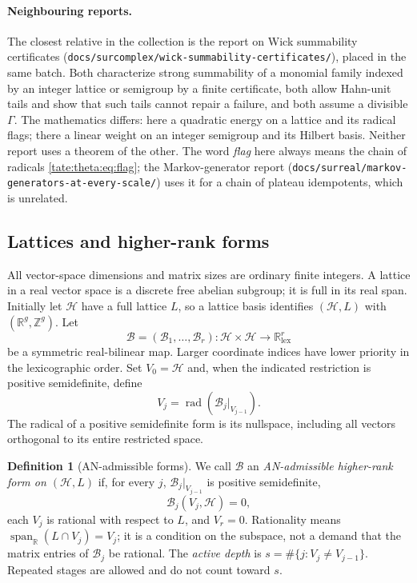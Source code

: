\documentclass[11pt,letterpaper]{article}
\theoremstyle{definition}
\newtheorem{definition}[definition]{Definition}
\newcommand{\R}{\mathbb R}
\newcommand{\Z}{\mathbb Z}
\newcommand{\file}[1]{\nolinkurl{#1}}
\newcommand{\rad}{\operatorname{rad}}
\newcommand{\spanR}{\operatorname{span}_{\R}}
\newcommand{\lex}{\mathrm{lex}}
\newcommand{\cB}{\mathcal B}
\newcommand{\cH}{\mathcal H}
\begin{document}
\paragraph{Neighbouring reports.}
The closest relative in the collection is the report on Wick summability
certificates (\file{docs/surcomplex/wick-summability-certificates/}), placed
in the same batch. Both characterize strong summability of a monomial
family indexed by an integer lattice or semigroup by a finite certificate,
both allow Hahn-unit tails and show that such tails cannot repair a failure,
and both assume a divisible $\Gamma$. The mathematics differs: here a
quadratic energy on a lattice and its radical flags; there a linear weight
on an integer semigroup and its Hilbert basis. Neither report uses a theorem
of the other. The word \emph{flag} here always means the chain of radicals
\eqref{tate:theta:eq:flag}; the Markov-generator report
(\file{docs/surreal/markov-generators-at-every-scale/}) uses it for a chain
of plateau idempotents, which is unrelated.

\subsection{Lattices and higher-rank forms}

All vector-space dimensions and matrix sizes are ordinary finite integers.
A lattice in a real vector space is a discrete free abelian subgroup; it is
full in its real span. Initially let $\cH$ have a full lattice $L$, so a
lattice basis identifies $(\cH,L)$ with $(\R^g,\Z^g)$. Let
\[
 \cB=(\cB_1,\ldots,\cB_r):\cH\times\cH\longrightarrow\R^r_{\lex}
\]
be a symmetric real-bilinear map. Larger coordinate indices have lower
priority in the lexicographic order. Set $V_0=\cH$ and, when the indicated
restriction is positive semidefinite, define
\begin{equation}
 V_j=\rad(\cB_j|_{V_{j-1}}).\label{tate:theta:eq:flag}
\end{equation}
The radical of a positive semidefinite form is its nullspace, including all
vectors orthogonal to its entire restricted space.

\begin{definition}[AN-admissible forms]\label{tate:theta:def:admissible}
We call $\cB$ an \emph{AN-admissible higher-rank form on $(\cH,L)$} if, for
every $j$, $\cB_j|_{V_{j-1}}$ is positive semidefinite,
\begin{equation}
 \cB_j(V_j,\cH)=0,\label{tate:theta:eq:globalradical}
\end{equation}
each $V_j$ is rational with respect to $L$, and $V_r=0$. Rationality means
$\spanR(L\cap V_j)=V_j$; it is a condition on the subspace, not a demand
that the matrix entries of $\cB_j$ be rational. The \emph{active depth} is
$s=\#\{j:V_j\ne V_{j-1}\}$. Repeated stages are allowed and do not count
toward $s$.
\end{definition}
\end{document}
